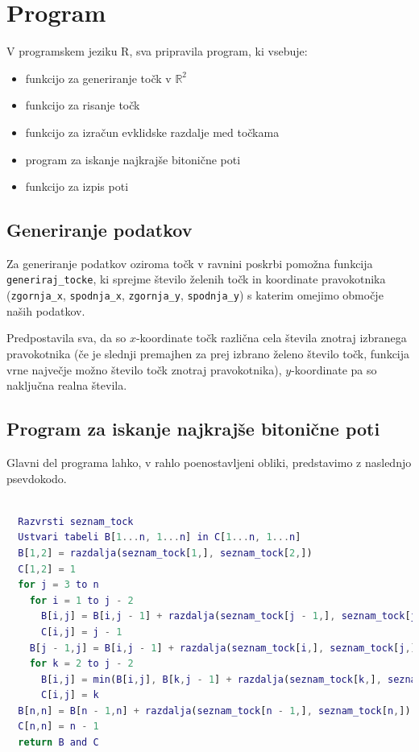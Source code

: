 \documentclass[12pt,a4paper]{amsart}
\theoremstyle{definition}
\theoremstyle{plain}
\newcommand{\R}{\mathbb R}
\begin{document}
\section{Program}

\noindent
V programskem jeziku R, sva pripravila program, ki vsebuje:

\begin{itemize}
  \item funkcijo za generiranje točk v $\R^2$
  \item funkcijo za risanje točk
  \item funkcijo za izračun evklidske razdalje med točkama
  \item program za iskanje najkrajše bitonične poti
  \item funkcijo za izpis poti
  \newline

\end{itemize}

\subsection{Generiranje podatkov}

\noindent
Za generiranje podatkov oziroma točk v ravnini poskrbi pomožna funkcija \texttt{generiraj\_tocke}, ki sprejme
število želenih točk in koordinate pravokotnika (\texttt{zgornja\_x}, \texttt{spodnja\_x}, \texttt{zgornja\_y},
\texttt{spodnja\_y}) s katerim omejimo območje naših podatkov. 
\newline

\noindent
Predpostavila sva, da so $x$-koordinate točk
različna cela števila znotraj izbranega pravokotnika (če je slednji premajhen za prej izbrano želeno število
točk, funkcija vrne največje možno število točk znotraj pravokotnika), $y$-koordinate pa so naključna
realna števila.
\newline

\subsection{Program za iskanje najkrajše bitonične poti}

\noindent
Glavni del programa lahko, v rahlo poenostavljeni obliki, predstavimo z naslednjo
psevdokodo.
\newline

\begin{lstlisting}[basicstyle=\tiny, language=Matlab]

  Razvrsti seznam_tock
  Ustvari tabeli B[1...n, 1...n] in C[1...n, 1...n]
  B[1,2] = razdalja(seznam_tock[1,], seznam_tock[2,])
  C[1,2] = 1
  for j = 3 to n
    for i = 1 to j - 2
      B[i,j] = B[i,j - 1] + razdalja(seznam_tock[j - 1,], seznam_tock[j,])
      C[i,j] = j - 1
    B[j - 1,j] = B[i,j - 1] + razdalja(seznam_tock[i,], seznam_tock[j,])
    for k = 2 to j - 2
      B[i,j] = min(B[i,j], B[k,j - 1] + razdalja(seznam_tock[k,], seznam_tock[j,]))
      C[i,j] = k
  B[n,n] = B[n - 1,n] + razdalja(seznam_tock[n - 1,], seznam_tock[n,])
  C[n,n] = n - 1
  return B and C

\end{lstlisting}
\end{document}
